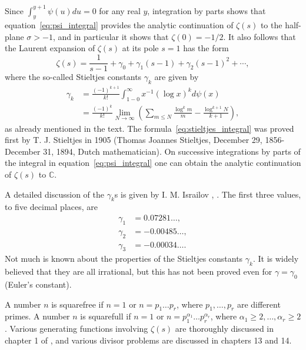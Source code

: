 \documentclass[11pt]{article}
\begin{document}
Since $\int_y^{y+1} \psi(u) du = 0$ for any real $y$, integration by parts shows that equation~\eqref{eq:psi_integral} provides the analytic continuation of $\zeta(s)$ to the half-plane $\sigma > -1$, and in particular it shows that $\zeta(0) = -1/2$. It also follows that the Laurent expansion of $\zeta(s)$ at its pole $s = 1$ has the form
\begin{equation}\label{eq:laurent_stieltjes}
\zeta(s) = \frac{1}{s-1} + \gamma_0 + \gamma_1(s-1) + \gamma_2(s-1)^2 + \cdots,
\end{equation}
where the so-called Stieltjes constants $\gamma_k$ are given by
\begin{align}\label{eq:stieltjes_integral}
\gamma_k &= \frac{(-1)^{k+1}}{k!} \int_{1-0}^{\infty} x^{-1} (\log x)^k d\psi(x) \\
&= \frac{(-1)^k}{k!} \lim_{N \to \infty} \left( \sum_{m \leq N} \frac{\log^k m}{m} - \frac{\log^{k+1} N}{k+1} \right), \nonumber
\end{align}
as already mentioned in the text. The formula~\eqref{eq:stieltjes_integral} was proved first by T. J. Stieltjes \cite{Sti} in 1905 (Thomas Joannes Stieltjes, December 29, 1856-December 31, 1894, Dutch mathematician). On successive integrations by parts of the integral in equation~\eqref{eq:psi_integral} one can obtain the analytic continuation of $\zeta(s)$ to $\mathbb{C}$.

A detailed discussion of the $\gamma_k$s is given by I. M. Israilov \cite{Isr1}, \cite{Isr2}. The first three values, to five decimal places, are
\begin{align}\label{eq:stieltjes_values}
\gamma_1 &= 0.07281\ldots, \\
\gamma_2 &= -0.00485\ldots, \nonumber \\
\gamma_3 &= -0.00034\ldots. \nonumber
\end{align}
Not much is known about the properties of the Stieltjes constants $\gamma_k$. It is widely believed that they are all irrational, but this has not been proved even for $\gamma = \gamma_0$ (Euler's constant).

A number $n$ is squarefree if $n = 1$ or $n = p_1 \ldots p_r$, where $p_1, \ldots, p_r$ are different primes. A number $n$ is squarefull if $n = 1$ or $n = p_1^{\alpha_1} \ldots p_r^{\alpha_r}$, where $\alpha_1 \geq 2, \ldots, \alpha_r \geq 2$. Various generating functions involving $\zeta(s)$ are thoroughly discussed in chapter 1 of \cite{Iv1}, and various divisor problems are discussed in chapters 13 and 14.
\end{document}
